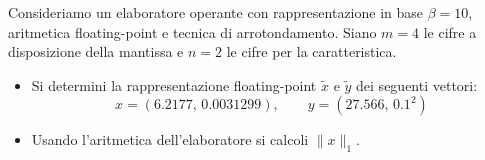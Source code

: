 Consideriamo un elaboratore operante con rappresentazione in base
$\beta=10$, aritmetica floating-point e tecnica di
arrotondamento. Siano $m=4$ le cifre a disposizione
della mantissa e $n=2$ le cifre per la caratteristica.\\
\begin{itemize}
\item
\noindent Si determini la rappresentazione floating-point
$\widetilde{x}$ e $\widetilde{y}$ dei seguenti vettori:
\[ x=(6.2177,\,  0.0031299), \quad \quad  y=(27.566, \, 0.1^{2}) \]

\item

\noindent Usando l'aritmetica dell'elaboratore si calcoli
$\|x\|_1$.
\end{itemize}
